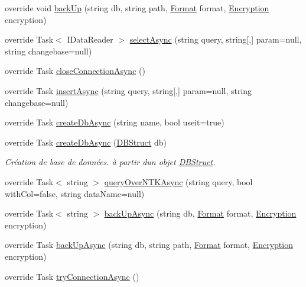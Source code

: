 \begin{DoxyCompactItemize}
override void \mbox{\hyperlink{class_n_t_k_1_1_database_1_1_n_t_k_d___sql_server_a65f31788ddd6e53215d0977e4ff5ce64}{back\+Up}} (string db, string path, \mbox{\hyperlink{namespace_n_t_k_1_1_database_a9bed700210ca4ed5854002637b664789}{Format}} format, \mbox{\hyperlink{namespace_n_t_k_1_1_database_aa21afe93187a6c77c4ccdc988b3c4ac2}{Encryption}} encryption)
\item 
override Task$<$ I\+Data\+Reader $>$ \mbox{\hyperlink{class_n_t_k_1_1_database_1_1_n_t_k_d___sql_server_ad2e51c5ebdce076174762b9fe8142804}{select\+Async}} (string query, string\mbox{[},\mbox{]} param=null, string changebase=null)
\item 
override Task \mbox{\hyperlink{class_n_t_k_1_1_database_1_1_n_t_k_d___sql_server_abfb6ed70d7c551c05d54efcc61598a07}{close\+Connection\+Async}} ()
\item 
override Task \mbox{\hyperlink{class_n_t_k_1_1_database_1_1_n_t_k_d___sql_server_a7bb00fd52c18da3bf8c5d56884626f4d}{insert\+Async}} (string query, string\mbox{[},\mbox{]} param=null, string changebase=null)
\item 
override Task \mbox{\hyperlink{class_n_t_k_1_1_database_1_1_n_t_k_d___sql_server_a169b74e9fdc436d76790f0f8011627a1}{create\+Db\+Async}} (string name, bool useit=true)
\item 
override Task \mbox{\hyperlink{class_n_t_k_1_1_database_1_1_n_t_k_d___sql_server_a00f1405bc4a1b9240a281792a619547c}{create\+Db\+Async}} (\mbox{\hyperlink{class_n_t_k_1_1_database_1_1_d_b_struct}{D\+B\+Struct}} db)
\begin{DoxyCompactList}\small\item\em Création de base de données. à partir d\textquotesingle{}un objet \mbox{\hyperlink{class_n_t_k_1_1_database_1_1_d_b_struct}{D\+B\+Struct}}. \end{DoxyCompactList}\item 
override Task$<$ string $>$ \mbox{\hyperlink{class_n_t_k_1_1_database_1_1_n_t_k_d___sql_server_a7c93061e063f98557311a8bb451f8598}{query\+Over\+N\+T\+K\+Async}} (string query, bool with\+Col=false, string data\+Name=null)
\item 
override Task$<$ string $>$ \mbox{\hyperlink{class_n_t_k_1_1_database_1_1_n_t_k_d___sql_server_aa1965f88c6f8e9cd2082acd89e1580b9}{back\+Up\+Async}} (string db, \mbox{\hyperlink{namespace_n_t_k_1_1_database_a9bed700210ca4ed5854002637b664789}{Format}} format, \mbox{\hyperlink{namespace_n_t_k_1_1_database_aa21afe93187a6c77c4ccdc988b3c4ac2}{Encryption}} encryption)
\item 
override Task \mbox{\hyperlink{class_n_t_k_1_1_database_1_1_n_t_k_d___sql_server_ad7709c3f59d63d8c5d48878932a94f43}{back\+Up\+Async}} (string db, string path, \mbox{\hyperlink{namespace_n_t_k_1_1_database_a9bed700210ca4ed5854002637b664789}{Format}} format, \mbox{\hyperlink{namespace_n_t_k_1_1_database_aa21afe93187a6c77c4ccdc988b3c4ac2}{Encryption}} encryption)
\item 
override Task \mbox{\hyperlink{class_n_t_k_1_1_database_1_1_n_t_k_d___sql_server_ae10ab9b2cb44ca086117cac435c5bff1}{try\+Connection\+Async}} ()
\end{DoxyCompactItemize}
